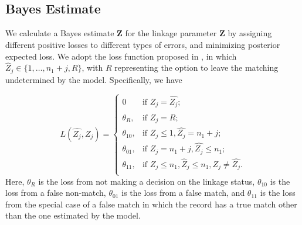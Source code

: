 \documentclass[ba]{imsart}
\begin{document}
%

\hypertarget{bayes-estimate}{%
	\subsection{Bayes Estimate}
	\label{bayes-estimate}}

We calculate a Bayes estimate \(\hat{\bm{Z}}\) for the linkage
parameter \(\bm{Z}\) by assigning different positive losses to
different types of errors, and minimizing posterior expected loss. We
adopt the loss function proposed in \cite{sadinle_bayesian_2017}, in which
\(\hat{Z}_j \in \{1, \ldots, n_1 + j, R\}\), with \(R\) representing the
option to leave the matching undetermined by the model. Specifically, we have

\[L(\hat{Z_j}, Z_j)=\begin{cases} 
	0  & \text{if } Z_j = \hat{Z_j}; \\
	\theta_R,  & \text{if } \hat{Z_j} = R; \\
	\theta_{10},  & \text{if } Z_j \leq 1,\hat{Z_j} = n_1 + j ; \\
	\theta_{01},  & \text{if } Z_j = n_1 + j,\hat{Z_j} \leq n_1 ; \\
	\theta_{11},  & \text{if } Z_j \leq n_1, \hat{Z}_j \leq n_1, Z_j \neq \hat{Z_j}. \\
\end{cases}\] 
Here, \(\theta_R\) is the loss from not making a decision on the linkage status, \(\theta_{10}\) is the loss from a false non-match, \(\theta_{01}\) is the loss from a false match, and \(\theta_{11}\) is the loss from the special case of a false match in which the record has a true match other than the one estimated by the model. 
\end{document}

